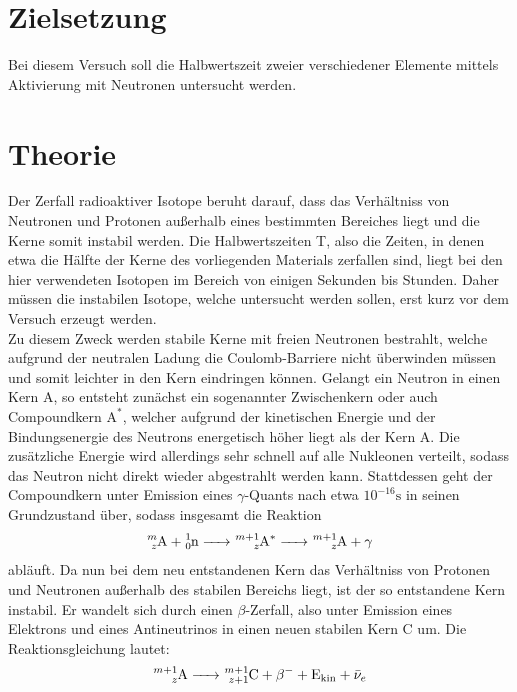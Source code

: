 \section{Zielsetzung}
Bei diesem Versuch soll die Halbwertszeit zweier verschiedener Elemente mittels
Aktivierung mit Neutronen untersucht werden.

\section{Theorie}
Der Zerfall radioaktiver Isotope beruht darauf, dass das Verhältniss von Neutronen
und Protonen außerhalb eines bestimmten Bereiches liegt und die Kerne somit instabil
werden.
Die Halbwertszeiten T, also die Zeiten, in denen etwa die Hälfte der Kerne des vorliegenden
Materials zerfallen sind, liegt bei den hier verwendeten Isotopen im Bereich von einigen
Sekunden bis Stunden. Daher müssen die instabilen Isotope, welche untersucht werden
sollen, erst kurz vor dem Versuch erzeugt werden. \\
Zu diesem Zweck werden stabile Kerne mit freien Neutronen bestrahlt, welche
aufgrund der neutralen Ladung die Coulomb-Barriere nicht überwinden müssen und somit leichter
in den Kern eindringen können.
Gelangt ein Neutron in einen Kern A, so entsteht zunächst ein sogenannter Zwischenkern
oder auch Compoundkern $\text{A}^*$, welcher aufgrund der kinetischen Energie und
der Bindungsenergie des Neutrons energetisch höher liegt als der Kern A.
Die zusätzliche Energie wird allerdings sehr schnell auf alle Nukleonen verteilt, sodass
das Neutron nicht direkt wieder abgestrahlt werden kann. Stattdessen geht der
Compoundkern unter Emission eines $\gamma$-Quants nach etwa ${10^{-16}}\si{\second}$
in seinen Grundzustand über, sodass insgesamt die Reaktion
\begin{equation}
  \ce{^{m}_{z}A + ^1_0n -> ^{m+1}_{z}A^* -> ^{m+1}_{z}A} + \gamma
  \label{eqn:reak1}
\end{equation}
abläuft.
Da nun bei dem neu entstandenen Kern das Verhältniss von Protonen und Neutronen außerhalb
des stabilen Bereichs liegt, ist der so entstandene Kern instabil. Er wandelt sich
durch einen $\beta$-Zerfall, also unter Emission eines Elektrons und eines Antineutrinos
in einen neuen stabilen Kern C um. Die Reaktionsgleichung lautet:
\begin{equation}
  \ce{^{m+1}_{z}A -> ^{m+1}_{z+1}C} + \beta^- + \text{E}_{\text{kin}} + \bar{\nu}_e
  \label{eqn:reak2}
\end{equation}
\\
